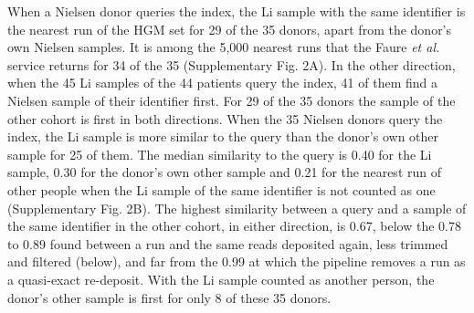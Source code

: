 \documentclass[11pt,a4paper]{article}
\begin{document}
When a Nielsen donor queries the index, the Li sample with the same identifier is the nearest run of the HGM set for 29 of the 35 donors, apart from the donor's own Nielsen samples. It is among the 5,000 nearest runs that the Faure \textit{et al.}\cite{faure2026} service returns for 34 of the 35 (Supplementary Fig. 2A). In the other direction, when the 45 Li samples of the 44 patients query the index, 41 of them find a Nielsen sample of their identifier first. For 29 of the 35 donors the sample of the other cohort is first in both directions. When the 35 Nielsen donors query the index, the Li sample is more similar to the query than the donor's own other sample for 25 of them. The median similarity to the query is 0.40 for the Li sample, 0.30 for the donor's own other sample and 0.21 for the nearest run of other people when the Li sample of the same identifier is not counted as one (Supplementary Fig. 2B). The highest similarity between a query and a sample of the same identifier in the other cohort, in either direction, is 0.67, below the 0.78 to 0.89 found between a run and the same reads deposited again, less trimmed and filtered (below), and far from the 0.99 at which the pipeline removes a run as a quasi-exact re-deposit. With the Li sample counted as another person, the donor's other sample is first for only 8 of these 35 donors.
\end{document}

